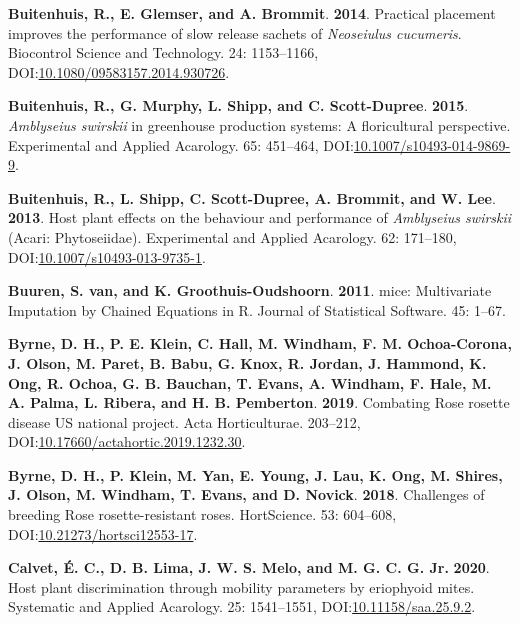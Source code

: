 \documentclass[12pt,final,CPage]{ufthesis}
\newlength{\cslhangindent}
\newenvironment{CSLReferences}[2] %
{%
	\setlength{\parindent}{0pt}
	\ifodd #1 \everypar{\setlength{\hangindent}{\cslhangindent}}\ignorespaces\fi
	\ifnum #2 > 0
	\setlength{\parskip}{#2\baselineskip}
	\fi
}%
{}
\begin{document}
{\begin{CSLReferences}{1}{0}
  \leavevmode{}%
  \textbf{Buitenhuis, R., E. Glemser, and A. Brommit}. \textbf{2014}. Practical placement improves the performance of slow release sachets of {\emph{Neoseiulus cucumeris}}. Biocontrol Science and Technology. 24: 1153--1166, DOI:\href{https://doi.org/10.1080/09583157.2014.930726}{10.1080/09583157.2014.930726}.

  \leavevmode{}%
  \textbf{Buitenhuis, R., G. Murphy, L. Shipp, and C. Scott-Dupree}. \textbf{2015}. {\emph{Amblyseius swirskii}} in greenhouse production systems: A floricultural perspective. Experimental and Applied Acarology. 65: 451--464, DOI:\href{https://doi.org/10.1007/s10493-014-9869-9}{10.1007/s10493-014-9869-9}.

  \leavevmode{}%
  \textbf{Buitenhuis, R., L. Shipp, C. Scott-Dupree, A. Brommit, and W. Lee}. \textbf{2013}. Host plant effects on the behaviour and performance of {\emph{Amblyseius swirskii}} ({Acari}: {Phytoseiidae}). Experimental and Applied Acarology. 62: 171--180, DOI:\href{https://doi.org/10.1007/s10493-013-9735-1}{10.1007/s10493-013-9735-1}.

  \leavevmode{}%
  \textbf{Buuren, S. van, and K. Groothuis-Oudshoorn}. \textbf{2011}. {mice}: {Multivariate} {Imputation} by {Chained} {Equations} in {R}. Journal of Statistical Software. 45: 1--67.

  \leavevmode{}%
  \textbf{Byrne, D. H., P. E. Klein, C. Hall, M. Windham, F. M. Ochoa-Corona, J. Olson, M. Paret, B. Babu, G. Knox, R. Jordan, J. Hammond, K. Ong, R. Ochoa, G. B. Bauchan, T. Evans, A. Windham, F. Hale, M. A. Palma, L. Ribera, and H. B. Pemberton}. \textbf{2019}. Combating {Rose rosette disease} {US} national project. Acta Horticulturae. 203--212, DOI:\href{https://doi.org/10.17660/actahortic.2019.1232.30}{10.17660/actahortic.2019.1232.30}.

  \leavevmode{}%
  \textbf{Byrne, D. H., P. Klein, M. Yan, E. Young, J. Lau, K. Ong, M. Shires, J. Olson, M. Windham, T. Evans, and D. Novick}. \textbf{2018}. Challenges of breeding {Rose rosette}-resistant roses. {HortScience}. 53: 604--608, DOI:\href{https://doi.org/10.21273/hortsci12553-17}{10.21273/hortsci12553-17}.

  \leavevmode{}%
  \textbf{Calvet, É. C., D. B. Lima, J. W. S. Melo, and M. G. C. G. Jr.} \textbf{2020}. Host plant discrimination through mobility parameters by eriophyoid mites. Systematic and Applied Acarology. 25: 1541--1551, DOI:\href{https://doi.org/10.11158/saa.25.9.2}{10.11158/saa.25.9.2}.


\end{CSLReferences}}
\end{document}
